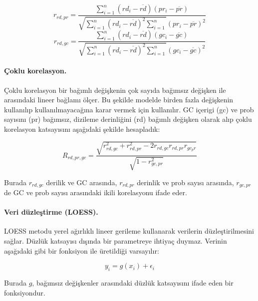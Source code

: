 \documentclass[11pt]{article}
\begin{document}
\[r_{rd,pr} = \frac{\sum_{i=1}^{n}(rd_i-\overline{rd})(pr_i-\overline{pr})}{\sqrt{\sum_{i=1}^{n}(rd_i-\overline{rd})^2\sum_{i=1}^{n}}(pr_i-\overline{pr})^2} \]
\[r_{rd,gc} = \frac{\sum_{i=1}^{n}(rd_i-\overline{rd})(gc_i-\overline{gc})}{\sqrt{\sum_{i=1}^{n}(rd_i-\overline{rd})^2\sum_{i=1}^{n}}(gc_i-\overline{gc})^2} \]

\paragraph{Çoklu korelasyon.}
Çoklu korelasyon bir bağımlı değişkenin çok sayıda bağımsız değişken ile arasındaki lineer bağlamı ölçer. Bu şekilde modelde birden fazla değişkenin kullanılıp kullanılmayacağına karar vermek için kullanılır. GC içerigi (gc) ve prob sayısını (pr) bağımsız, dizileme derinliğini (rd) bağımlı değişken olarak alıp çoklu korelasyon katsayısını aşağıdaki şekilde hesapladık:

\[R_{rd,pr,gc} = \frac{\sqrt{r_{rd,gc}^2 + r_{rd,pr}^2 - 2r_{rd,gc}r_{rd,pr}r_{gc_pr}}}{\sqrt{1-r_{gc,pr}^2}}\]

Burada $r_{rd,gc}$ derilik ve GC arasında, $r_{rd,pr}$ derinlik ve prob sayısı arasında, $r_{gc,pr}$ de GC ve prob sayısı arasındaki ikili korelasyonu ifade eder.

\paragraph{Veri düzleştirme (LOESS).} 
LOESS metodu yerel ağırlıklı lineer gerileme kullanarak verilerin düzleştirilmesini sağlar. Düzlük katsayısı dışında bir parametreye ihtiyaç duymaz. Verinin aşağıdaki gibi bir fonksiyon ile üretildiği varsayılır:

\[y_i = g(x_i) + \epsilon_i\]

Burada $g$, bağımsız değişkenler arasındaki düzlük katsayısını ifade eden bir fonksiyondur.



\end{document}
